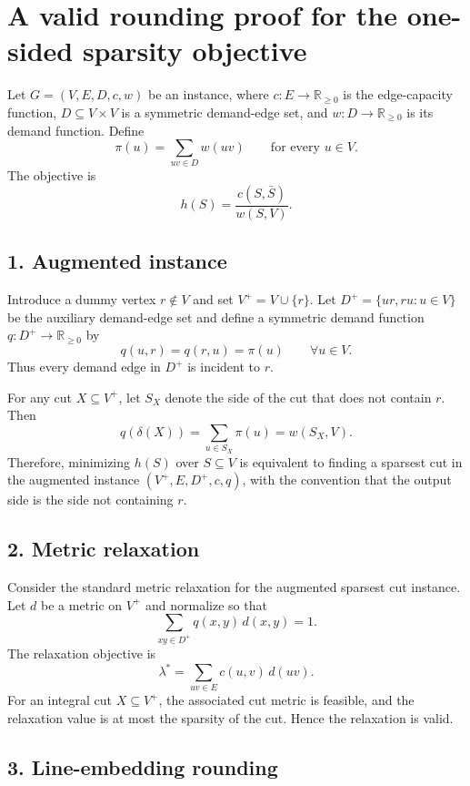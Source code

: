 \documentclass[11pt]{article}
\newcommand{\br}[1]{\left(#1\right)}
\newcommand{\cut}{\delta}
\begin{document}
\section*{A valid rounding proof for the one-sided sparsity objective}

Let $G=(V,E,D,c,w)$ be an instance, where $c\colon E\to\mathbb{R}_{\ge 0}$ is the edge-capacity function, $D\subseteq V\times V$ is a symmetric demand-edge set, and $w\colon D\to\mathbb{R}_{\ge 0}$ is its demand function. Define
\[
\pi(u)=\sum_{uv\in D} w\br{uv}
\qquad\text{for every }u\in V.
\]
The objective is
\[
 h\br{S}=\frac{c\br{S,\bar S}}{w\br{S,V}}.
\]

\subsection*{1. Augmented instance}

Introduce a dummy vertex $r\notin V$ and set $V^+=V\cup\{r\}$. Let $D^+=\{ur,ru:u\in V\}$ be the auxiliary demand-edge set and define a symmetric demand function $q\colon D^+\to\mathbb{R}_{\ge 0}$ by
\[
q\br{u,r}=q\br{r,u}=\pi(u)\qquad\forall u\in V.
\]
Thus every demand edge in $D^+$ is incident to $r$.

For any cut $X\subseteq V^+$, let $S_X$ denote the side of the cut that does not contain $r$. Then
\[
q\br{\cut\br{X}}=\sum_{u\in S_X}\pi(u)=w\br{S_X,V}.
\]
Therefore, minimizing $h(S)$ over $S\subseteq V$ is equivalent to finding a sparsest cut in the augmented instance $(V^+,E,D^+,c,q)$, with the convention that the output side is the side not containing $r$.

\subsection*{2. Metric relaxation}

Consider the standard metric relaxation for the augmented sparsest cut instance. Let $d$ be a metric on $V^+$ and normalize so that
\[
\sum_{xy\in D^+} q\br{x,y}\,d\br{x,y}=1.
\]
The relaxation objective is
\[
\lambda^* = \sum_{uv\in E} c\br{u,v}\,d\br{uv}.
\]
For an integral cut $X\subseteq V^+$, the associated cut metric is feasible, and the relaxation value is at most the sparsity of the cut. Hence the relaxation is valid.

\subsection*{3. Line-embedding rounding}
\end{document}
